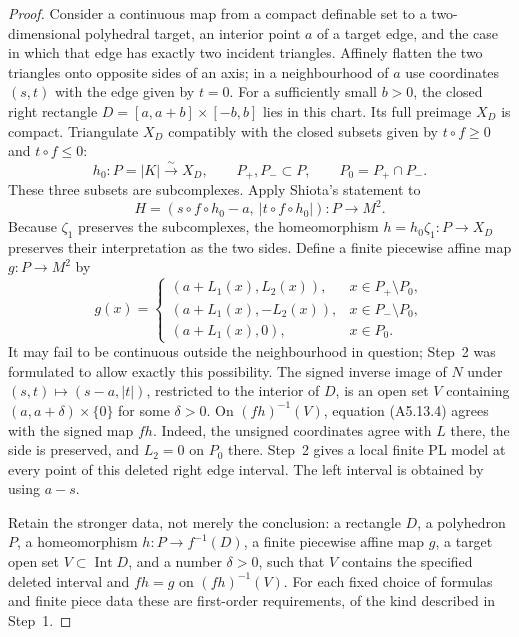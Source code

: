 \begin{proof}
Consider a continuous map from a compact definable set to a
two-dimensional polyhedral target, an interior point $a$ of a
target edge, and the case in which that edge has exactly two
incident triangles.  Affinely flatten the two triangles onto
opposite sides of an axis; in a neighbourhood of $a$ use
coordinates $(s,t)$ with the edge given by $t=0$.  For a sufficiently
small $b>0$, the closed right rectangle
$D=[a,a+b]\times[-b,b]$ lies in this chart.  Its full preimage
$X_D$ is compact.  Triangulate $X_D$ compatibly with the closed
subsets given by $t\circ f\geq0$ and $t\circ f\leq0$:
\[
 h_0:P=|K|\xrightarrow{\sim}X_D,
 \qquad P_+,P_-\subset P,
 \qquad P_0=P_+\cap P_- .
\]
These three subsets are subcomplexes.  Apply Shiota's statement to
\[
 H=(s\circ f\circ h_0-a,\ |t\circ f\circ h_0|):P\longrightarrow M^2.
\]
Because $\zeta_1$ preserves the subcomplexes, the homeomorphism
$h=h_0\zeta_1:P\to X_D$ preserves their interpretation as the two
sides.  Define a finite piecewise affine map $g:P\to M^2$ by
\[
 g(x)=
 \begin{cases}
 (a+L_1(x), L_2(x)),&x\in P_+\setminus P_0,\\
 (a+L_1(x),-L_2(x)),&x\in P_-\setminus P_0,\\
 (a+L_1(x),0),&x\in P_0.
 \end{cases}
 \tag{A5.13.4}
\]
It may fail to be continuous outside the neighbourhood in question;
Step~2 was formulated to allow exactly this possibility.
The signed inverse image of $N$ under $(s,t)\mapsto(s-a,|t|)$,
restricted to the interior of $D$, is an open set $V$ containing
$(a,a+\delta)\times\{0\}$ for some $\delta>0$.  On
$(f h)^{-1}(V)$, equation (A5.13.4) agrees with the signed map
$f h$.  Indeed, the unsigned coordinates agree with $L$ there,
the side is preserved, and $L_2=0$ on $P_0$ there.  Step~2 gives
a local finite PL model at every point of this deleted right
edge interval.  The left interval is obtained by using $a-s$.

Retain the stronger data, not merely the conclusion: a rectangle
$D$, a polyhedron $P$, a homeomorphism $h:P\to f^{-1}(D)$,
a finite piecewise affine map $g$, a target open set
$V\subset\operatorname{Int}D$, and a number $\delta>0$, such that
$V$ contains the specified deleted interval and $fh=g$ on
$(fh)^{-1}(V)$.  For each fixed choice of formulas and finite
piece data these are first-order requirements, of the kind
described in Step~1.


\end{proof}
